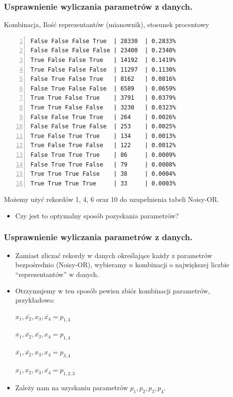 \documentclass{beamer}
\begin{document}
\begin{frame}[fragile]
\frametitle{Usprawnienie wyliczania parametrów z danych.}
\begingroup
\fontsize{5pt}{5pt}
Kombinacja, Ilość reprezentantów (mianownik), stosunek procentowy
\begin{Verbatim}[frame=single, numbers=left, numbersep=2pt]
False False False True  | 28330  | 0.2833%
False False False False | 23400  | 0.2340%
True False False True   | 14192  | 0.1419%
True False False False  | 11297  | 0.1130%
False True False True   | 8162   | 0.0816%
False True False False  | 6589   | 0.0659%
True True False True    | 3791   | 0.0379%
True True False False   | 3230   | 0.0323%
False False True True   | 264    | 0.0026%
False False True False  | 253    | 0.0025%
True False True True    | 134    | 0.0013%
True False True False   | 122    | 0.0012%
False True True True    | 86     | 0.0009%
False True True False   | 79     | 0.0008%
True True True False    | 38     | 0.0004%
True True True True     | 33     | 0.0003%
\end{Verbatim}
\endgroup
\vspace{-1ex}
Możemy użyć rekordów 1, 4, 6 oraz 10 do uzupełnienia tabeli Noisy-OR.
\begin{itemize}
    \item Czy jest to optymalny sposób pozyskania parametrów?
\end{itemize}
\end{frame}

\begin{frame}
\frametitle{Usprawnienie wyliczania parametrów z danych.}
	\begin{itemize}
		\item Zamiast zliczać rekordy w danych określające każdy z parametrów bezpośrednio (Noisy-OR), wybieramy $n$ kombinacji o największej liczbie ``reprezentantów'' w danych.
    \end{itemize}
    \begin{itemize}
	    \item Otrzymujemy w ten sposób pewien zbiór kombinacji parametrów, przykładowo:

			$x_1, \bar{x_2}, x_3, \bar{x_4} = p_{1,3}$

			$x_1, \bar{x_2}, \bar{x_3}, x_4 = p_{1,4}$

			$\bar{x_1}, \bar{x_2}, x_3, x_4 = p_{3,4}$

			$x_1, x_2, x_3, \bar{x_4} = p_{1,2,3}$
		\pause \item Zależy nam na uzyskaniu parametrów $p_1, p_2, p_3, p_4$.
	\end{itemize}
\end{frame}
\end{document}
